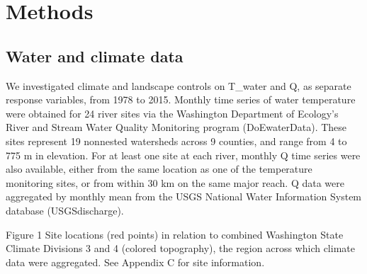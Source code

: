 \section*{Methods}

\subsection*{Water and climate data}

We investigated climate and landscape controls on T_water and Q, as separate response variables, from 1978 to 2015. Monthly time series of water temperature were obtained for 24 river sites via the Washington Department of Ecology's River and Stream Water Quality Monitoring program (DoEwaterData). These sites represent 19 nonnested watersheds across 9 counties, and range from 4 to 775 m in elevation. For at least one site at each river, monthly Q time series were also available, either from the same location as one of the temperature monitoring sites, or from within 30 km on the same major reach. Q data were aggregated by monthly mean from the USGS National Water Information System database (USGSdischarge).

\begin{center}
Figure 1 Site locations (red points) in relation to combined Washington State Climate Divisions 3 and 4 (colored topography), the region across which climate data were aggregated. See Appendix C for site information.
\end{center}


